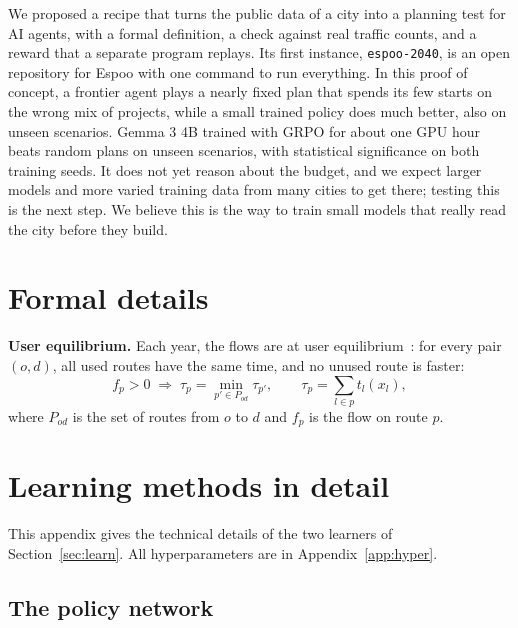 \documentclass{article}
\newcommand{\repo}{\texttt{espoo-2040}}
\begin{document}
We proposed a recipe that turns the public data of a city into a planning test for AI agents, with a formal definition, a check against real traffic counts, and a reward that a separate program replays. Its first instance, \repo{}, is an open repository for Espoo with one command to run everything. In this proof of concept, a frontier agent plays a nearly fixed plan that spends its few starts on the wrong mix of projects, while a small trained policy does much better, also on unseen scenarios. Gemma 3 4B trained with GRPO for about one GPU hour beats random plans on unseen scenarios, with statistical significance on both training seeds. It does not yet reason about the budget, and we expect larger models and more varied training data from many cities to get there; testing this is the next step. We believe this is the way to train small models that really read the city before they build.




\clearpage
\appendix

\section{Formal details}\label{app:formal}

\textbf{User equilibrium.} Each year, the flows are at user equilibrium~\cite{wardrop1952}: for every pair $(o,d)$, all used routes have the same time, and no unused route is faster:
\begin{equation}
f_p>0 \;\Rightarrow\; \tau_p=\min_{p'\in P_{od}}\tau_{p'},\qquad \tau_p=\sum_{l\in p}t_l(x_l),
\end{equation}
where $P_{od}$ is the set of routes from $o$ to $d$ and $f_p$ is the flow on route $p$.

\section{Learning methods in detail}\label{app:learn}

This appendix gives the technical details of the two learners of Section~\ref{sec:learn}. All hyperparameters are in Appendix~\ref{app:hyper}.

\subsection{The policy network}\label{app:policy}
\end{document}
